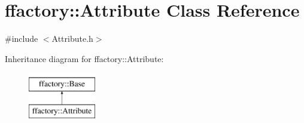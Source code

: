 \hypertarget{classffactory_1_1_attribute}{\section{ffactory\-:\-:Attribute Class Reference}
\label{classffactory_1_1_attribute}
}


{\ttfamily \#include $<$Attribute.\-h$>$}

Inheritance diagram for ffactory\-:\-:Attribute\-:\begin{figure}[H]
\begin{center}
\leavevmode
\includegraphics[height=2.000000cm]{classffactory_1_1_attribute}
\end{center}
\end{figure}
